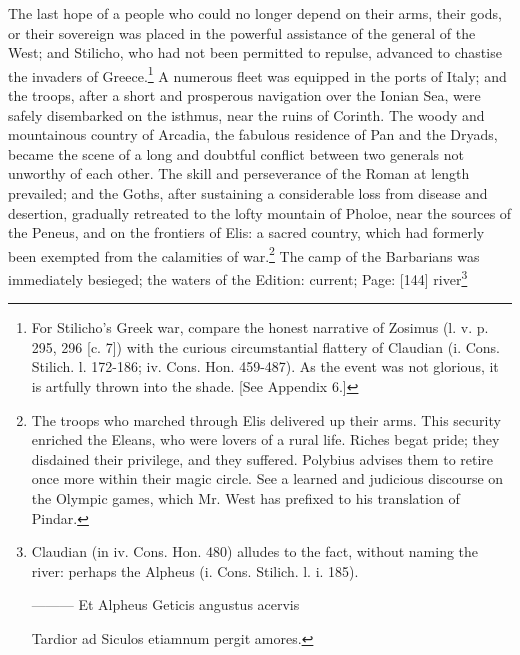 The last hope of a people who could no longer depend on their arms, their gods, or their sovereign was placed in the powerful assistance of the general of the West; and Stilicho, who had not been permitted to repulse, advanced to chastise the invaders of Greece.\footnote{For Stilicho\texthebrew{}’s Greek war, compare the honest narrative of Zosimus (l. v. p. 295, 296 [c. 7]) with the curious circumstantial flattery of Claudian (i. Cons. Stilich. l. 172-186; iv. Cons. Hon. 459-487). As the event was not glorious, it is artfully thrown into the shade. [See Appendix 6.]} A numerous fleet was equipped in the ports of Italy; and the troops, after a short and prosperous navigation over the Ionian Sea, were safely disembarked on the isthmus, near the ruins of Corinth. The woody and mountainous country of Arcadia, the fabulous residence of Pan and the Dryads, became the scene of a long and doubtful conflict between two generals not unworthy of each other. The skill and perseverance of the Roman at length prevailed; and the Goths, after sustaining a considerable loss from disease and desertion, gradually retreated to the lofty mountain of Pholoe, near the sources of the Peneus, and on the frontiers of Elis: a sacred country, which had formerly been exempted from the calamities of war.\footnote{The troops who marched through Elis delivered up their arms. This security enriched the Eleans, who were lovers of a rural life. Riches begat pride; they disdained their privilege, and they suffered. Polybius advises them to retire once more within their magic circle. See a learned and judicious discourse on the Olympic games, which Mr. West has prefixed to his translation of Pindar.} The camp of the Barbarians was immediately besieged; the waters of the Edition: current; Page: [144] river\footnote{Claudian (in iv. Cons. Hon. 480) alludes to the fact, without naming the river: perhaps the Alpheus (i. Cons. Stilich. l. i. 185).

\texthebrew{———} Et Alpheus Geticis angustus acervis

Tardior ad Siculos etiamnum pergit amores.

}
